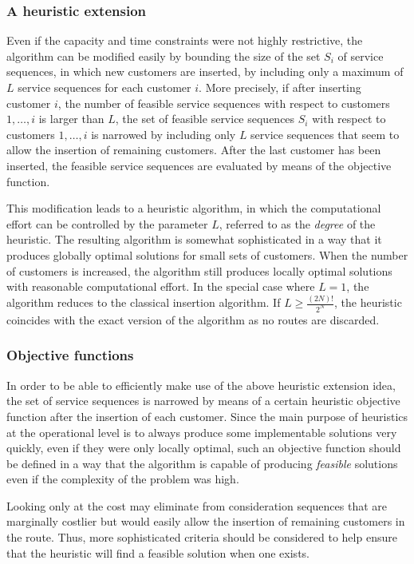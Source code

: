 \documentclass[dissertation,draft*]{aaltoseries}
\begin{document}
\subsubsection{A heuristic extension}
\label{svheuristic}
Even if the capacity and time constraints were not highly restrictive, the algorithm can be 
modified easily by bounding the size of the set $S_i$ 
of service sequences, in which new customers are inserted, 
by including only a maximum of $L$ service sequences
for each customer $i$. More precisely, if after inserting 
customer $i$, the number of feasible service sequences with respect to customers $1,\ldots, i$
is larger than $L$, the set of feasible service sequences $S_i$ with respect to 
customers $1,\ldots, i$ is narrowed by including only $L$  
service sequences that seem to allow the insertion of remaining customers.
After the last customer has been inserted, the feasible service sequences are evaluated
by means of the objective function.

This modification leads to a heuristic algorithm, in which the computational
effort can be controlled by the parameter $L$, referred to as the \emph{degree} of
the heuristic. The resulting algorithm is
somewhat sophisticated in a way that it produces globally optimal solutions for
small sets of customers. When the number of customers is increased, the
algorithm still produces locally optimal solutions with 
reasonable computational effort. In the special case where $L=1$, the
algorithm reduces to the classical insertion algorithm. 
If $L \geq \frac{(2N)!}{2^N}$, the heuristic coincides with the exact version of the 
algorithm as no routes are discarded.

\subsubsection{Objective functions}
\label{hobjfunc}
In order to be able to efficiently make use of the above heuristic extension
idea, the set of service sequences is narrowed by means of a certain heuristic objective function
after the insertion of each customer.
Since the main purpose of heuristics at the operational level is to always produce some implementable 
solutions very quickly, even if they were only locally optimal, such an objective function should 
be defined in a way that the algorithm is 
capable of producing \emph{feasible} solutions even if the complexity of the problem was high. %

Looking only at the cost may eliminate from consideration
sequences that are marginally costlier but would easily allow the
insertion of remaining customers in the route. 
Thus, more sophisticated criteria should be considered to help ensure that the heuristic will
find a feasible solution when one exists.
\end{document}

